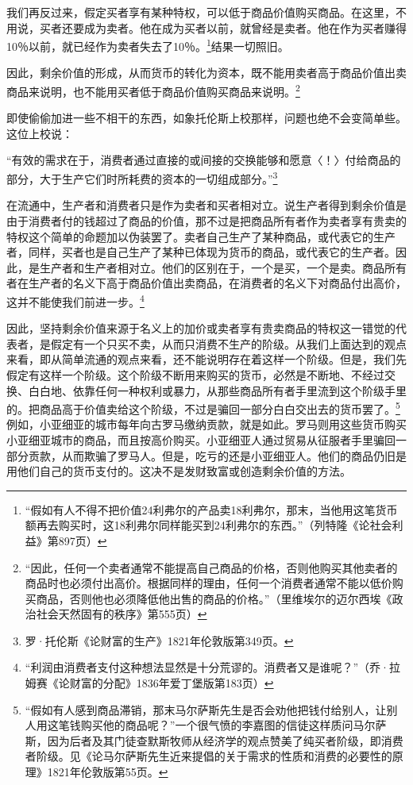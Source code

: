 \documentclass{ctexbook}
\begin{document}
    我们再反过来，假定买者享有某种特权，可以低于商品价值购买商品。在这里，不用说，买者还要成为卖者。他在成为买者以前，就曾经是卖者。他在作为买者赚得10％以前，就已经作为卖者失去了10％。\footnote{“假如有人不得不把价值24利弗尔的产品卖18利弗尔，那末，当他用这笔货币额再去购买时，这18利弗尔同样能买到24利弗尔的东西。”（列特隆《论社会利益》第897页）}结果一切照旧。

    因此，剩余价值的形成，从而货币的转化为资本，既不能用卖者高于商品价值出卖商品来说明，也不能用买者低于商品价值购买商品来说明。\footnote{“因此，任何一个卖者通常不能提高自己商品的价格，否则他购买其他卖者的商品时也必须付出高价。根据同样的理由，任何一个消费者通常不能以低价购买商品，否则他也必须降低他出售的商品的价格。”（里维埃尔的迈尔西埃《政治社会天然固有的秩序》第555页）}

    即使偷偷加进一些不相干的东西，如象托伦斯上校那样，问题也绝不会变简单些。这位上校说：

    “有效的需求在于，消费者通过直接的或间接的交换能够和愿意〈！〉付给商品的部分，大于生产它们时所耗费的资本的一切组成部分。”\footnote{罗·托伦斯《论财富的生产》1821年伦敦版第349页。}

    在流通中，生产者和消费者只是作为卖者和买者相对立。说生产者得到剩余价值是由于消费者付的钱超过了商品的价值，那不过是把商品所有者作为卖者享有贵卖的特权这个简单的命题加以伪装罢了。卖者自己生产了某种商品，或代表它的生产者，同样，买者也是自己生产了某种已体现为货币的商品，或代表它的生产者。因此，是生产者和生产者相对立。他们的区别在于，一个是买，一个是卖。商品所有者在生产者的名义下高于商品价值出卖商品，在消费者的名义下对商品付出高价，这并不能使我们前进一步。\footnote{“利润由消费者支付这种想法显然是十分荒谬的。消费者又是谁呢？”（乔·拉姆赛《论财富的分配》1836年爱丁堡版第183页）}

    因此，坚持剩余价值来源于名义上的加价或卖者享有贵卖商品的特权这一错觉的代表者，是假定有一个只买不卖，从而只消费不生产的阶级。从我们上面达到的观点来看，即从简单流通的观点来看，还不能说明存在着这样一个阶级。但是，我们先假定有这样一个阶级。这个阶级不断用来购买的货币，必然是不断地、不经过交换、白白地、依靠任何一种权利或暴力，从那些商品所有者手里流到这个阶级手里的。把商品高于价值卖给这个阶级，不过是骗回一部分白白交出去的货币罢了。\footnote{“假如有人感到商品滞销，那末马尔萨斯先生是否会劝他把钱付给别人，让别人用这笔钱购买他的商品呢？”一个很气愤的李嘉图的信徒这样质问马尔萨斯，因为后者及其门徒查默斯牧师从经济学的观点赞美了纯买者阶级，即消费者阶级。见《论马尔萨斯先生近来提倡的关于需求的性质和消费的必要性的原理》1821年伦敦版第55页。}例如，小亚细亚的城市每年向古罗马缴纳贡款，就是如此。罗马则用这些货币购买小亚细亚城市的商品，而且按高价购买。小亚细亚人通过贸易从征服者手里骗回一部分贡款，从而欺骗了罗马人。但是，吃亏的还是小亚细亚人。他们的商品仍旧是用他们自己的货币支付的。这决不是发财致富或创造剩余价值的方法。
\end{document}
